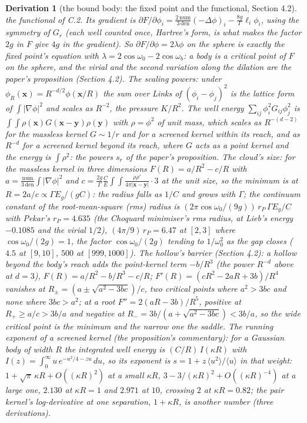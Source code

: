 \documentclass[pdflatex,sn-mathphys-num]{sn-jnl}
\newcommand{\num}{\mathrm{num}}
\newcommand{\den}{\mathrm{den}}
\theoremstyle{thmstyleone}
\newtheorem{derivation}{Derivation}
\begin{document}
\begin{derivation}[the bound body: the fixed point and the functional, Section 4.2]
the functional of C.2. Its gradient is $\partial F / \partial\phi_i = \frac{2\,\num}{3\,\den}(-\Delta\phi)_i - \frac{8g}{\Gamma}\ell_i\phi_i$, using the symmetry of $G_r$ (each well counted once, Hartree's form, is what makes the factor $2g$ in $F$ give $4g$ in the gradient). So $\partial F / \partial\phi = 2\lambda\phi$ on the sphere is exactly the fixed point's equation with $\lambda = 2\cos\omega_0 - 2\cos\omega_b$: a body is a critical point of $F$ on the sphere, and the virial and the second variation along the dilation are the paper's proposition (Section 4.2). \emph{The scaling powers:} under $\phi_R(\mathbf x) = R^{-d / 2}\phi(\mathbf x / R)$ the sum over Links of $(\phi_i - \phi_j)^2$ is the lattice form of $\int|\nabla\phi|^2$ and scales as $R^{-2}$, the pressure $K / R^2$. The well energy $\sum_{ij}\phi_i^2 G_{ij}\phi_j^2$ is $\int\!\!\int\rho(\mathbf x)G(\mathbf x - \mathbf y)\rho(\mathbf y)$ with $\rho = \phi^2$ of unit mass, which scales as $R^{-(d - 2)}$ for the massless kernel $G \sim 1 / r$ and for a screened kernel within its reach, and as $R^{-d}$ for a screened kernel beyond its reach, where $G$ acts as a point kernel and the energy is $\int\rho^2$: the powers $s_r$ of the paper's proposition. \emph{The cloud's size:} for the massless kernel in three dimensions $F(R) = a / R^2 - c / R$ with $a = \frac{\num}{3\,\den}\int|\nabla\phi|^2$ and $c = \frac{2g}{\Gamma}\frac{C}{E}\int\!\!\int\frac{\rho\rho'}{4\pi|\mathbf x - \mathbf y|}\cdot 3$ at the unit size, so the minimum is at $R = 2a / c \propto \Gamma E_g / (gC)$: the radius falls as $1 / C$ and grows with $\Gamma$; the continuum constant of the root-mean-square (rms) radius is $(2\pi\cos\omega_0 / (9g))\,r_P\,\Gamma E_g / C$ with Pekar's $r_P = 4.635$ \cite{pekar} (the Choquard minimiser's rms radius, at Lieb's energy $-0.1085$ \cite{lieb} and the virial $1 / 2$), $(4\pi / 9)\,r_P = 6.47$ at $[2, 3]$ where $\cos\omega_0 / (2g) = 1$, the factor $\cos\omega_0 / (2g)$ tending to $1 / \omega_0^2$ as the gap closes ($4.5$ at $[9, 10]$, $500$ at $[999, 1000]$). \emph{The hollow's barrier (Section 4.2):} a hollow beyond the body's reach adds the point-kernel term $-b / R^3$ (the power $R^{-d}$ above at $d = 3$), $F(R) = a / R^2 - b / R^3 - c / R$; $F'(R) = (cR^2 - 2aR + 3b) / R^4$ vanishes at $R_\pm = (a \pm \sqrt{a^2 - 3bc}) / c$, two critical points where $a^2 > 3bc$ and none where $3bc > a^2$; at a root $F'' = 2(aR - 3b) / R^5$, positive at $R_+ \ge a / c > 3b / a$ and negative at $R_- = 3b / (a + \sqrt{a^2 - 3bc}) < 3b / a$, so the wide critical point is the minimum and the narrow one the saddle. \emph{The running exponent of a screened kernel (the proposition's commentary):} for a Gaussian body of width $R$ the integrated well energy is $(C / R)\,I(\kappa R)$ with $I(z) = \int_0^\infty u\,e^{-u^2 / 4 - zu}\,du$, so its exponent is $s = 1 + z\,\langle u^2\rangle / \langle u\rangle$ in that weight: $1 + \sqrt\pi\,\kappa R + O((\kappa R)^2)$ at a small $\kappa R$, $3 - 3 / (\kappa R)^2 + O((\kappa R)^{-4})$ at a large one, $2.130$ at $\kappa R = 1$ and $2.971$ at $10$, crossing $2$ at $\kappa R = 0.82$; the pair kernel's log-derivative at one separation, $1 + \kappa R$, is another number (three derivations). 

\end{derivation}
\end{document}
